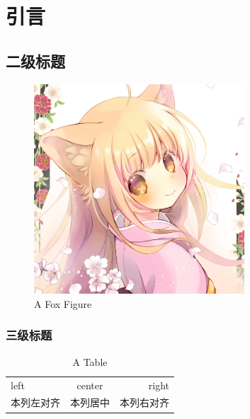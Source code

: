\chapter{引言}

\section{二级标题}

\zhlipsum

\begin{figure}[H]
\centering
\includegraphics[width=0.7\textwidth]{figs/yurzi-avatar.png}
\caption{A Fox Figure}
\label{fig.1}
\end{figure}

\subsection{三级标题}

\begin{table}
\caption{A Table}
\begin{tabular}{lcr}
left&center&right\\  
本列左对齐&本列居中&本列右对齐\\
\end{tabular}
\end{table}

\zhlipsum
